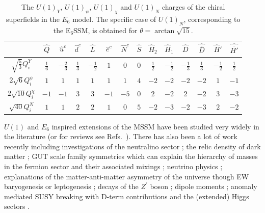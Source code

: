 \documentclass[preprint,amsmath,amssymb,aps,superscriptaddress,prd,
showpacs,floatfix,nofootinbib]{revtex4-1}
\begin{document}
\begin{table}[h]
\centering
\begin{ruledtabular}
\begin{tabular}{cccccccccccccc}
 & $\hat{Q}$ & $\hat{u}^c$ & $\hat{d}^c$ & $\hat{L}$ & $\hat{e}^c$ &
$\hat{N}^c$ & $\hat{S}$ & $\hat{H}_2$ & $\hat{H}_1$ & $\hat{D}$ &
$\hat{\overline{D}}$ & $\hat{H}'$ & $\hat{\overline{H'}}$ \\[1mm]
\hline
$\sqrt{\frac{5}{3}}Q_i^Y$ & $\frac{1}{6}$ & $-\frac{2}{3}$ & $\frac{1}{3}$ &
$-\frac{1}{2}$ & $1$ & $0$ & $0$ & $\frac{1}{2}$ & $-\frac{1}{2}$ &
$-\frac{1}{3}$ & $\frac{1}{3}$ & $-\frac{1}{2}$ & $\frac{1}{2}$ \\[1mm]
$2\sqrt{6}Q_i^\psi$ & $1$ & $1$ & $1$ & $1$ & $1$ & $1$ & $4$ & $-2$ & $-2$ &
$-2$ & $-2$ & $1$ & $-1$\\[1mm]
$2\sqrt{10}Q_i^\chi$ & $-1$ & $-1$ & $3$ & $3$ & $-1$ & $-5$ & $0$ & $2$ &
$-2$ & $2$ & $-2$ & $3$ & $-3$\\[1mm]
$\sqrt{40}Q_i^N$ & $1$ & $1$ & $2$ & $2$ & $1$ & $0$ & $5$ & $-2$ & $-3$ &
$-2$ & $-3$ & $2$ & $-2$ \\[1mm]
\end{tabular}
\end{ruledtabular}
\caption{The $U(1)_Y$, $U(1)_\psi$, $U(1)_\chi$ and $U(1)_N$ charges of the
chiral superfields in the $E_6$ model.  The specific case of $U(1)_N$,
corresponding to the E$_6$SSM, is obtained for $\theta = \arctan \sqrt{15}$.}
\label{tab:E6charges}
\end{table}


$U(1)$ and $E_6$ inspired extensions of the MSSM have been studied
very widely in the literature \cite{Gunion:1989we, Gunion:1992hs,
Binetruy:1985xm, Ellis:1986yg, Ibanez:1986si, Gunion:1986ky,
Haber:1986gz, Baer:1987eb, Gunion:1987jd, Grifols:1986vr,
Ellis:1986ip, Morris:1987fm, Drees:1987tp, Ma:1995xk,
Suematsu:1997tv, Suematsu:1997qt, Suematsu:1997au, Keith:1996fv,
Keith:1997zb, Gherghetta:1996yr, Demir:1998dk, Langacker:1998tc,
Hambye:2000bn, Ma:2000jf} (or for reviews see Refs.~\cite{Hewett:1988xc,
Langacker:2008yv}).  There has also been a lot of work recently including
investigations of the neutralino sector \cite{Hesselbach:2001ri,
Barger:2005hb, Choi:2006fz, Barger:2007nv}; the relic density of dark matter
\cite{Kalinowski:2008iq}; GUT scale family symmetries which can explain the
hierarchy of masses in the fermion sector and their associated mixings
\cite{Stech:2008wd}; neutrino physics \cite{Kang:2004ix}; explanations of
the matter-anti-matter asymmetry of the universe though EW baryogenesis or
leptogenesis \cite{Hambye:2000bn, Ma:2000jf, Kang:2004pp}; decays of the
$Z^\prime$ boson \cite{Kang:2004bz, Baumgart:2006pa, Athron:2011wu,
Chang:2011be}; dipole moments \cite{GutierrezRodriguez:2006hb}; anomaly
mediated SUSY breaking with D-term contributions \cite{Asano:2008ju} and
the (extended) Higgs sectors \cite{Daikoku:2000ep, Ham:2008xf}.
\end{document}
